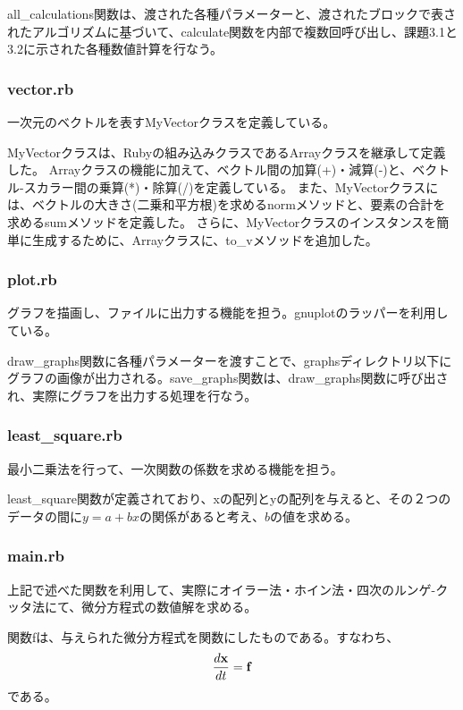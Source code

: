 \documentclass[11pt]{jsarticle}
\begin{document}
                all\_calculations関数は、渡された各種パラメーターと、渡されたブロックで表されたアルゴリズムに基づいて、calculate関数を内部で複数回呼び出し、課題3.1と3.2に示された各種数値計算を行なう。

            \subsubsection*{vector.rb}
                一次元のベクトルを表すMyVectorクラスを定義している。

                MyVectorクラスは、Rubyの組み込みクラスであるArrayクラスを継承して定義した。
                Arrayクラスの機能に加えて、ベクトル間の加算(+)・減算(-)と、ベクトル-スカラー間の乗算(*)・除算(/)を定義している。
                また、MyVectorクラスには、ベクトルの大きさ(二乗和平方根)を求めるnormメソッドと、要素の合計を求めるsumメソッドを定義した。
                さらに、MyVectorクラスのインスタンスを簡単に生成するために、Arrayクラスに、to\_vメソッドを追加した。

            \subsubsection*{plot.rb}
                グラフを描画し、ファイルに出力する機能を担う。gnuplotのラッパーを利用している。

                draw\_graphs関数に各種パラメーターを渡すことで、graphsディレクトリ以下にグラフの画像が出力される。save\_graphs関数は、draw\_graphs関数に呼び出され、実際にグラフを出力する処理を行なう。

            \subsubsection*{least\_square.rb}
                最小二乗法を行って、一次関数の係数を求める機能を担う。

                least\_square関数が定義されており、xの配列とyの配列を与えると、その２つのデータの間に$y=a+bx$の関係があると考え、$b$の値を求める。

            \subsubsection*{main.rb}
                上記で述べた関数を利用して、実際にオイラー法・ホイン法・四次のルンゲ-クッタ法にて、微分方程式の数値解を求める。

                関数fは、与えられた微分方程式を関数にしたものである。すなわち、
                \begin{eqnarray}
                    \frac{d{\bf x}}{dt} = {\bf f}
                \end{eqnarray}
                である。
\end{document}
